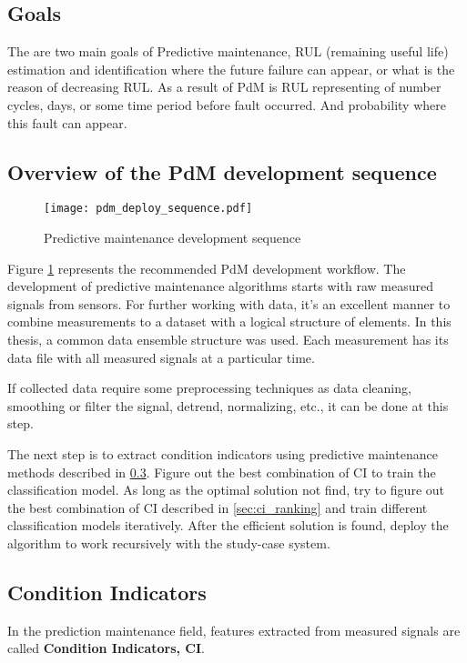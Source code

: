\subsection{Goals}
The are two main goals of Predictive maintenance, RUL (remaining useful
life) estimation and identification where the future failure can appear, or what is
the reason of decreasing RUL. 
As a result of PdM is RUL representing of number cycles, days, or some time
period before fault occurred. And probability where this fault can appear.

\subsection{Overview of the PdM development sequence}

\begin{figure}[h!]
    \centering
    \texttt{[image: pdm\_deploy\_sequence.pdf]}
    \caption{Predictive maintenance development sequence}
    \label{fig:pdm_dev_seq}
\end{figure}

Figure \ref{fig:pdm_dev_seq} represents the recommended PdM development
workflow.  The development of predictive maintenance algorithms starts with
raw measured signals from sensors. For further working with data, it's an
excellent manner to combine measurements to a dataset with a logical
structure of elements. In this thesis, a common data ensemble structure was
used. Each measurement has its data file with all measured signals at a
particular time. 

If collected data require some preprocessing techniques as data cleaning,
smoothing or filter the signal, detrend, normalizing, etc., it can be done
at this step. 

The next step is to extract condition indicators using predictive
maintenance methods described in \ref{sec:ci}. Figure out the best
combination of CI to train the classification model. As long as the optimal
solution not find, try to figure out the best combination of CI described
in \ref{sec:ci_ranking} and train different classification models
iteratively.  After the efficient solution is found, deploy the algorithm
to work recursively with the study-case system.


\subsection{Condition Indicators}\label{sec:ci}
In the prediction maintenance field, features extracted from measured
signals are called \textbf{Condition Indicators, CI}.

